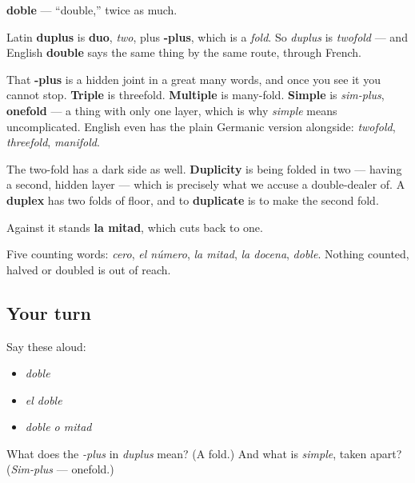 \begin{cousinweb}
\textbf{doble} — \textquotedblleft{}double,\textquotedblright{} twice as much.

Latin \textbf{duplus} is \textbf{duo}, \emph{two}, plus \textbf{-plus}, which is a \emph{fold}. So \emph{duplus} is \emph{twofold} — and English \textbf{double} says the same thing by the same route, through French.

That \textbf{-plus} is a hidden joint in a great many words, and once you see it you cannot stop. \textbf{Triple} is threefold. \textbf{Multiple} is many-fold. \textbf{Simple} is \emph{sim-plus}, \textbf{onefold} — a thing with only one layer, which is why \emph{simple} means uncomplicated. English even has the plain Germanic version alongside: \emph{twofold}, \emph{threefold}, \emph{manifold}.

The two-fold has a dark side as well. \textbf{Duplicity} is being folded in two — having a second, hidden layer — which is precisely what we accuse a double-dealer of. A \textbf{duplex} has two folds of floor, and to \textbf{duplicate} is to make the second fold.

Against it stands \textbf{la mitad}, which cuts back to one.
\end{cousinweb}

\begin{grammarlens}[title={What you've built}]
Five counting words: \emph{cero}, \emph{el número}, \emph{la mitad}, \emph{la docena}, \emph{doble}. Nothing counted, halved or doubled is out of reach.
\end{grammarlens}

\subsection*{Your turn}
Say these aloud:

\begin{itemize}
\raggedright
  \item \emph{doble}
  \item \emph{el doble}
  \item \emph{doble o mitad}
\end{itemize}

\begin{tcolorbox}[breakable,colback=teal!4,colframe=teal!35!black,title={Before you move on}]
What does the \emph{-plus} in \emph{duplus} mean? (A fold.) And what is \emph{simple}, taken apart? (\emph{Sim-plus} — onefold.)
\end{tcolorbox}
